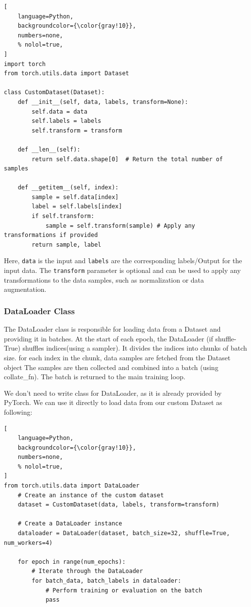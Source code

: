 \documentclass[12pt, a4paper]{article}
\begin{document}
\begin{lstlisting}[
    language=Python,
    backgroundcolor={\color{gray!10}},
    numbers=none,
    % nolol=true,
]
import torch
from torch.utils.data import Dataset

class CustomDataset(Dataset):
    def __init__(self, data, labels, transform=None):
        self.data = data
        self.labels = labels
        self.transform = transform

    def __len__(self):
        return self.data.shape[0]  # Return the total number of samples

    def __getitem__(self, index):
        sample = self.data[index]
        label = self.labels[index]
        if self.transform:
            sample = self.transform(sample) # Apply any transformations if provided
        return sample, label
\end{lstlisting}

Here, \texttt{data} is the input and \texttt{labels} are the corresponding labels/Output for the input data. The \texttt{transform} parameter is optional and can be used to apply any transformations to the data samples, such as normalization or data augmentation.

\subsubsection{DataLoader Class}

The DataLoader class is responsible for loading data from a Dataset and providing it in batches. 
At the start of each epoch, the DataLoader (if shuffle-True) shuffles indices(using a sampler). It divides the indices into chunks of batch size. for each index in the chunk, data samples are fetched from the Dataset object The samples are then collected and combined into a batch (using collate\_fn). The batch is returned to the main training loop.

We don't need to write class for DataLoader, as it is already provided by PyTorch. We can use it directly to load data from our custom Dataset as following:

\begin{lstlisting}[
    language=Python,
    backgroundcolor={\color{gray!10}},
    numbers=none,
    % nolol=true,
]
from torch.utils.data import DataLoader
    # Create an instance of the custom dataset
    dataset = CustomDataset(data, labels, transform=transform)

    # Create a DataLoader instance
    dataloader = DataLoader(dataset, batch_size=32, shuffle=True, num_workers=4)

    for epoch in range(num_epochs):
        # Iterate through the DataLoader
        for batch_data, batch_labels in dataloader:
            # Perform training or evaluation on the batch
            pass
\end{lstlisting}
\end{document}
